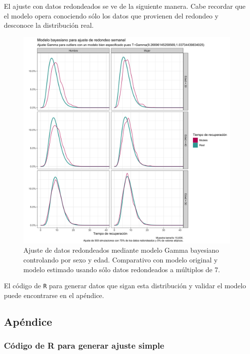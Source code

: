 \documentclass[
]{article}
\begin{document}
El ajuste con datos redondeados se ve de la siguiente manera. Cabe
recordar que el modelo opera conociendo sólo los datos que provienen del
redondeo y desconoce la distribución real.

\begin{figure}
\centering
\includegraphics{images/Atipicos_edad_gamma.png}
\caption{Ajuste de datos redondeados mediante modelo Gamma bayesiano
controlando por sexo y edad. Comparativo con modelo original y modelo
estimado usando sólo datos redondeados a múltiplos de 7.}
\end{figure}

El código de \texttt{R} para generar datos que sigan esta distribución y
validar el modelo puede encontrarse en el apéndice.

\hypertarget{apuxe9ndice}{%
\subsection{Apéndice}\label{apuxe9ndice}}

\hypertarget{cuxf3digo-de-r-para-generar-ajuste-simple}{%
\subsubsection{Código de R para generar ajuste
simple}\label{cuxf3digo-de-r-para-generar-ajuste-simple}}
\end{document}

